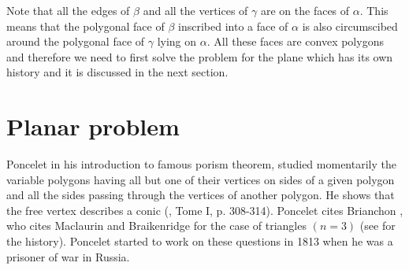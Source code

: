\documentclass{birkjour}
\theoremstyle{definition}
\theoremstyle{remark}
\numberwithin{equation}{section}
\begin{document}
Note that all the edges of $\beta $ and all the vertices of $\gamma$ are on the faces of $\alpha$. This means that the polygonal face of $\beta$ inscribed into a face of $\alpha$ is also circumscibed around the polygonal face of $\gamma$ lying on $\alpha$. All these faces are convex polygons and therefore we need to first solve the problem for the plane which has its own history and it is discussed in the next section.

\section{Planar problem}
Poncelet in his introduction to famous porism theorem, studied momentarily the variable polygons having all but one of their vertices on sides of a given polygon and all the sides passing
through the vertices of another polygon. He shows that the free vertex describes a conic (\cite{poncelet}, Tome I, p. 308-314). Poncelet cites Brianchon \cite{brian}, who cites Maclaurin \cite{mac} and Braikenridge 
\cite{braik} for the case of triangles $(n = 3)$ (see \cite{mills} for the history). Poncelet started to work on these questions in 1813 when he was a prisoner of war in Russia.
\end{document}
